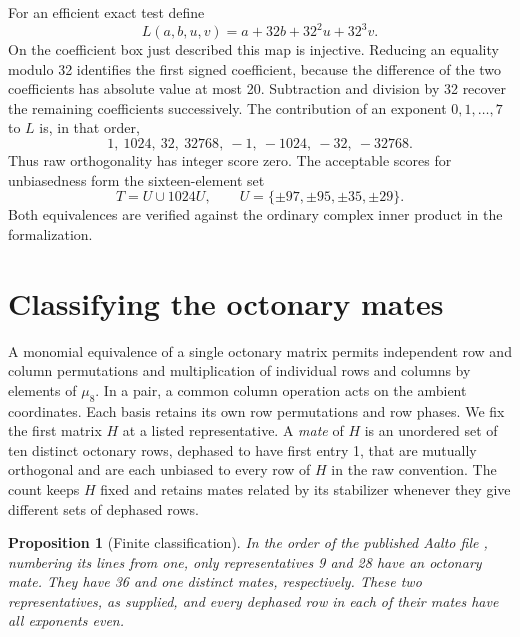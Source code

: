 \documentclass[11pt]{article}
\newtheorem{proposition}[theorem]{Proposition}
\newcommand{\code}[1]{\texttt{\detokenize{#1}}}
\begin{document}
For an efficient exact test define
\[
 L(a,b,u,v)=a+32b+32^2u+32^3v .
\]
On the coefficient box just described this map is injective. Reducing
an equality modulo 32 identifies the first signed coefficient, because
the difference of the two coefficients has absolute value at most 20.
Subtraction and division by 32 recover the remaining coefficients
successively. The contribution of an exponent \(0,1,\ldots,7\) to \(L\)
is, in that order,
\[
                1,\ 1024,\ 32,\ 32768,\ -1,\ -1024,\ -32,\ -32768 .
\]
Thus raw orthogonality has integer score zero. The acceptable scores
for unbiasedness form the sixteen-element set
\begin{equation}\label{eq:targets}
   T=U\cup 1024U,\qquad
   U=\{\pm97,\pm95,\pm35,\pm29\}.
\end{equation}
Both equivalences are verified against the ordinary complex inner product
in the formalization.

\section{Classifying the octonary mates}

A monomial equivalence of a single octonary matrix permits independent
row and column permutations and multiplication of individual rows and
columns by elements of \(\mu_8\). In a pair, a common column operation
acts on the ambient coordinates. Each basis retains its own row
permutations and row phases. We fix the first matrix \(H\) at a listed
representative. A \emph{mate} of \(H\) is an unordered set of ten
distinct octonary rows, dephased to have first entry 1, that are mutually
orthogonal and are each unbiased to every row of \(H\) in the raw
convention. The count keeps \(H\) fixed and retains mates related by
its stabilizer whenever they give different sets of dephased rows.

\begin{proposition}[Finite classification]\label{pr:scan}
In the order of the published Aalto file \code{BH-10-8.txt}, numbering
its lines from one, only representatives 9 and 28 have an octonary
mate. They have 36 and one distinct mates, respectively. These two
representatives, as supplied, and every dephased row in each of their
mates have all exponents even.
\end{proposition}
\end{document}
